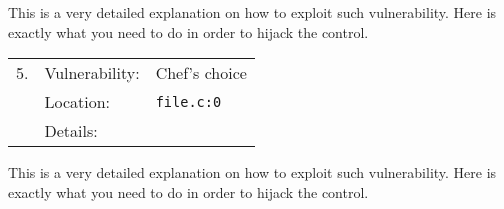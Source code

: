 \documentclass[11pt]{article}
\begin{document}
This is a very detailed explanation on how to exploit such vulnerability.
Here is exactly what you need to do in order to hijack the control.

\vspace{5mm}\noindent
\begin{tabular}{lll}
	5. & Vulnerability: & Chef's choice \\
	   & Location:      & \texttt{file.c:0} \\
	   & Details:       & \\
\end{tabular}

This is a very detailed explanation on how to exploit such vulnerability.
Here is exactly what you need to do in order to hijack the control.
\end{document}
